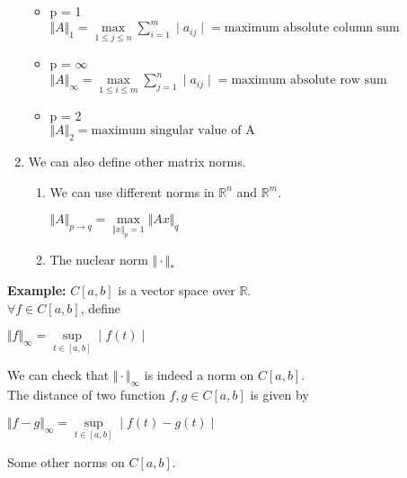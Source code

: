 \documentclass{article}
\begin{document}
\begin{enumerate}
\begin{center}
        \end{center}
        \begin{itemize}
            \item p = 1 \\
            $\Vert A \Vert_1 = \underset{1 \leq j \leq n}{\max} \sum_{i=1}^{m} \mid{a_{ij}\mid} = \text{maximum absolute column sum}$
            \item p = $\infty$ \\
            $\Vert A \Vert_\infty = \underset{1 \leq i \leq m}{\max} \sum_{j=1}^{n} \mid{a_{ij}\mid} = \text{maximum absolute row sum}$
            \item p = 2 \\
            $\Vert A \Vert_2 = \text{maximum singular value of A}$
        \end{itemize}
    \item We can also define other matrix norms. \\
        \begin{enumerate}
            \item We can use different norms in $\mathbb{R}^{n}$ and $\mathbb{R}^{m}$. 
                    \begin{center}
                        $\Vert A \Vert_{p \to q} = \underset{\Vert x \Vert_p = 1}{\max} \Vert Ax \Vert_q$
                    \end{center}
            \item The nuclear norm $\Vert \cdot \Vert_*$
        \end{enumerate}
\end{enumerate}

\textbf{Example: } $C[a,b]$ is a vector space over $\mathbb{R}$. \\
$\forall f \in C[a,b]$, define
    \begin{center}
        $\Vert f \Vert_\infty = \underset{t \in [a,b]}{\sup} \mid{f(t)}\mid$
    \end{center}
    We can check that $\Vert \cdot \Vert_\infty$ is indeed a norm on $C[a,b]$. \\
    The distance of two function $f,g \in C[a,b]$ is given by
    \begin{center}
        $\Vert f - g \Vert_\infty = \underset{t \in [a,b]}{\sup} \mid{f(t) - g(t)}\mid$ \\
    \end{center}

\pagebreak
Some other norms on $C[a,b]$. 
\begin{enumerate}
    \item $\Vert f \Vert_1 = \int_{b}^{a} \mid{f(t)}\mid dt}$
    \item $\Vert f \Vert_2= (\int_{b}^{a} \mid{f(t)}\mid ^ 2 dt)^ \frac{1}{2}}$
    \item $\Vert f \Vert_p= (\int_{b}^{a} \mid{f(t)}\mid ^ p dt)^ \frac{1}{p}}$
\end{enumerate}
    
\end{document}
